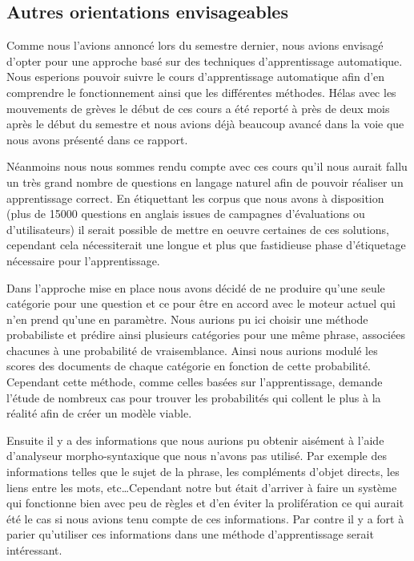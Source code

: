 \documentclass[10pt,a4paper]{article}
\begin{document}
\subsection{Autres orientations envisageables}
\par Comme nous l'avions annoncé lors du semestre dernier, nous avions envisagé d'opter pour une approche basé sur des techniques d'apprentissage automatique. Nous esperions pouvoir suivre le cours d'apprentissage automatique afin d'en comprendre le fonctionnement ainsi que les différentes méthodes. Hélas avec les mouvements de grèves le début de ces cours a été reporté à près de deux mois après le début du semestre et nous avions déjà beaucoup avancé dans la voie que nous avons présenté dans ce rapport. 
\par Néanmoins nous nous sommes rendu compte avec ces cours qu'il nous aurait fallu un très grand nombre de questions en langage naturel afin de pouvoir réaliser un apprentissage correct. En étiquettant les corpus que nous avons à disposition (plus de 15000 questions en anglais issues de campagnes d'évaluations ou d'utilisateurs) il serait possible de mettre en oeuvre certaines de ces solutions, cependant cela nécessiterait une longue et plus que fastidieuse phase d'étiquetage nécessaire pour l'apprentissage.
\par Dans l'approche mise en place nous avons décidé de ne produire qu'une seule catégorie pour une question et ce pour être en accord avec le moteur actuel qui n'en prend qu'une en paramètre. Nous aurions pu ici choisir une méthode probabiliste et prédire ainsi plusieurs catégories pour une même phrase, associées chacunes à une probabilité de vraisemblance. Ainsi nous aurions modulé les scores des documents de chaque catégorie en fonction de cette probabilité. Cependant cette méthode, comme celles basées sur l'apprentissage, demande l'étude de nombreux cas pour trouver les probabilités qui collent le plus à la réalité afin de créer un modèle viable.
\par Ensuite il y a des informations que nous aurions pu obtenir aisément à l'aide d'analyseur morpho-syntaxique que nous n'avons pas utilisé. Par exemple des informations telles que le sujet de la phrase, les compléments d'objet directs, les liens entre les mots, etc\ldots Cependant notre but était d'arriver à faire un système qui fonctionne bien avec peu de règles et d'en éviter la prolifération ce qui aurait été le cas si nous avions tenu compte de ces informations. Par contre il y a fort à parier qu'utiliser ces informations dans une méthode d'apprentissage serait intéressant.
\end{document}
